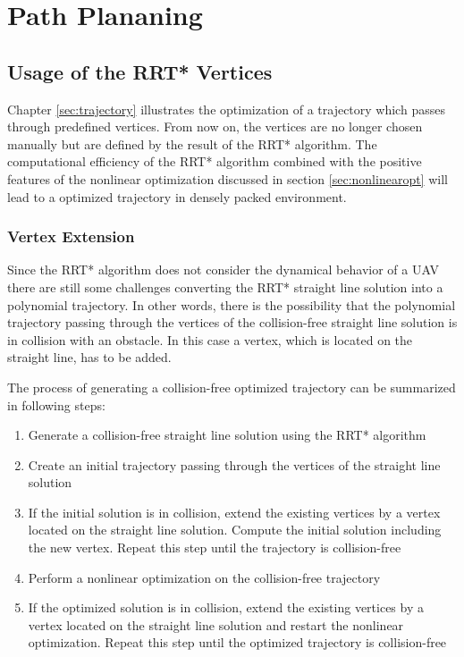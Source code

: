 \chapter{Path Plananing}\label{chap:Planning}

\section{Usage of the RRT* Vertices}

Chapter \ref{sec:trajectory} illustrates the optimization of a trajectory which passes through predefined vertices. From now on, the vertices are no longer chosen manually but are defined by the result of the RRT* algorithm. The computational efficiency of the RRT* algorithm combined with the positive features of the nonlinear optimization discussed in section \ref{sec:nonlinearopt} will lead to a optimized trajectory in densely packed environment.

\subsection{Vertex Extension}


Since the RRT* algorithm does not consider the dynamical behavior of a UAV there are still some challenges converting the RRT* straight line solution into a polynomial trajectory. In other words, there is the possibility that the polynomial trajectory passing through the vertices of the collision-free straight line solution is in collision with an obstacle. In this case a vertex, which is located on the straight line, has to be added. \newline

The process of generating a collision-free optimized trajectory can be summarized in following steps:


\begin{enumerate}
  \item Generate a collision-free straight line solution using the RRT* algorithm
  \item Create an initial trajectory passing through the vertices of the straight line solution
  \item If the initial solution is in collision, extend the existing vertices by a vertex located on the straight line solution. Compute the initial solution including the new vertex. Repeat this step until the trajectory is collision-free
\item Perform a nonlinear optimization on the collision-free trajectory
\item If the optimized solution is in collision, extend the existing vertices by a vertex located on the straight line solution and restart the nonlinear optimization. Repeat this step until the optimized trajectory is collision-free
\end{enumerate}

